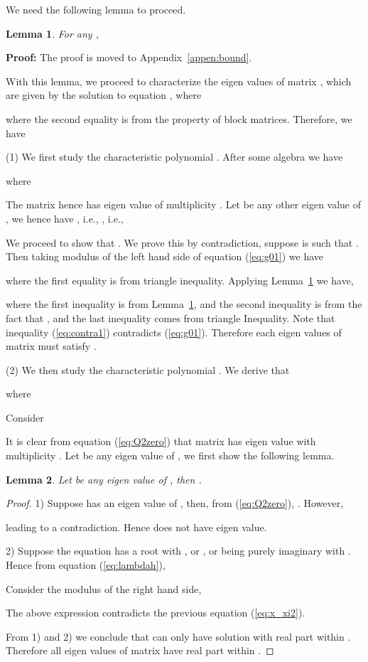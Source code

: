 \documentclass[11pt,twocolumn]{IEEEtran}
\newtheorem{lemma}{Lemma}
\begin{document}
We need the following lemma to proceed.
\begin{lemma}
\label{lemma:bound}
For any ,

\end{lemma}

\noindent \textbf{Proof:}
The proof is moved to Appendix~\ref{appen:bound}. 
\vspace{3pt}

With this lemma, we proceed to characterize the eigen values of matrix , which are given by the solution to equation , where

where the second equality is from the property of block matrices. Therefore, we have


(1) We first study the characteristic polynomial . After some algebra we have

where


The matrix  hence has eigen value  of multiplicity . Let  be any other eigen value of , we hence have , i.e., , i.e.,


We proceed to show that . We prove this by contradiction, suppose  is such that . Then taking modulus of the left hand side of equation (\ref{eq:g01}) we have

where the first equality is from triangle inequality. Applying Lemma~\ref{lemma:bound} we have,

where the first inequality is from Lemma~\ref{lemma:bound}, and the second inequality is from the fact that , and the last inequality comes from triangle Inequality. Note that inequality (\ref{eq:contra1}) contradicts (\ref{eq:g01}). Therefore each eigen values of matrix  must satisfy .
\vspace{8pt}

(2) We then study the characteristic polynomial . We derive that

where


Consider


It is clear from equation (\ref{eq:Q2zero}) that matrix  has eigen value  with multiplicity . Let  be any eigen value of , we first show the following lemma.

\begin{lemma}
\label{lemma:real_bound}
Let  be any eigen value of , then .
\end{lemma}

\begin{proof}
1) Suppose  has an eigen value of , then, from (\ref{eq:Q2zero}), . However,

leading to a contradiction. Hence  does not have  eigen value.

2) Suppose the equation  has a root  with , or , or being purely imaginary with . Hence from equation (\ref{eq:lambdah}),


Consider the  modulus of the right hand side,


The above expression contradicts the previous equation (\ref{eq:x_xi2}).
\vspace{4pt}

From 1) and 2) we conclude that  can only have solution with real part within . Therefore all eigen values of matrix  have real part within .
\end{proof}
\vspace{5pt}
\end{document}
